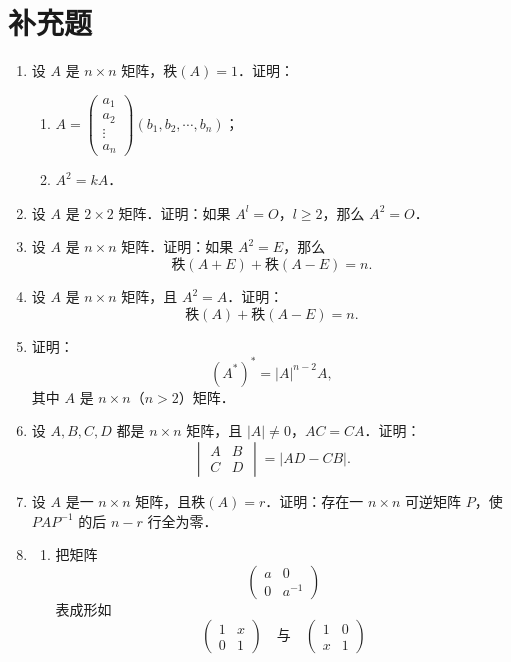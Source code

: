 \section{补充题}
\begin{enumerate}
  \item 设 $A$ 是 $n\times n$ 矩阵，秩$(A)=1$．证明：
  \begin{enumerate}
    \item $A=\begin{pmatrix}a_1\\a_2\\\vdots\\a_n\end{pmatrix}(b_1,b_2,\cdots,b_n)$；
  \anssub
    \item $A^2=kA$．
  \anssub
  \end{enumerate}
  \item 设 $A$ 是 $2\times2$ 矩阵．证明：如果 $A^l=O$，$l\geqslant2$，那么 $A^2=O$．
  \ansproof
  \item 设 $A$ 是 $n\times n$ 矩阵．证明：如果 $A^2=E$，那么
  \[
    \text{秩}(A+E)+\text{秩}(A-E)=n.
  \]
  \ansproof
  \item 设 $A$ 是 $n\times n$ 矩阵，且 $A^2=A$．证明：
  \[
    \text{秩}(A)+\text{秩}(A-E)=n.
  \]
  \ansproof
  \item 证明：
  \[
    (A^*)^*=|A|^{n-2}A,
  \]
  其中 $A$ 是 $n\times n$（$n>2$）矩阵．
  \ansproof
  \item 设 $A,B,C,D$ 都是 $n\times n$ 矩阵，且 $|A|\neq0$，$AC=CA$．证明：
  \[
    \begin{vmatrix}A&B\\C&D\end{vmatrix}=|AD-CB|.
  \]
  \ansproof
  \item 设 $A$ 是一 $n\times n$ 矩阵，且秩$(A)=r$．证明：存在一 $n\times n$ 可逆矩阵 $P$，使 $PAP^{-1}$ 的后 $n-r$ 行全为零．
  \ansproof
  \item
  \begin{enumerate}
    \item 把矩阵
    \[
      \begin{pmatrix}a&0\\0&a^{-1}\end{pmatrix}
    \]
    表成形如
    \[
      \begin{pmatrix}1&x\\0&1\end{pmatrix}
      \quad\text{与}\quad
      \begin{pmatrix}1&0\\x&1\end{pmatrix}
\]
\end{enumerate}
\end{enumerate}
